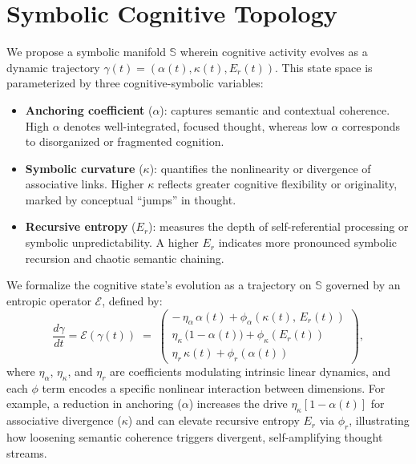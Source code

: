 \section*{Symbolic Cognitive Topology}

We propose a symbolic manifold $\mathbb{S}$ wherein cognitive activity evolves as a dynamic trajectory $\gamma(t) = (\alpha(t), \kappa(t), E_r(t))$. This state space is parameterized by three cognitive-symbolic variables:
\begin{itemize}
    \item \textbf{Anchoring coefficient} ($\alpha$): captures semantic and contextual coherence. High $\alpha$ denotes well-integrated, focused thought, whereas low $\alpha$ corresponds to disorganized or fragmented cognition.
    \item \textbf{Symbolic curvature} ($\kappa$): quantifies the nonlinearity or divergence of associative links. Higher $\kappa$ reflects greater cognitive flexibility or originality, marked by conceptual ``jumps'' in thought.
    \item \textbf{Recursive entropy} ($E_r$): measures the depth of self-referential processing or symbolic unpredictability. A higher $E_r$ indicates more pronounced symbolic recursion and chaotic semantic chaining.
\end{itemize}

We formalize the cognitive state’s evolution as a trajectory on $\mathbb{S}$ governed by an entropic operator $\mathcal{E}$, defined by:
\[
\frac{d\gamma}{dt} = \mathcal{E}(\gamma(t)) \;=\;
\begin{pmatrix}
    -\,\eta_\alpha\,\alpha(t) + \phi_\alpha(\kappa(t),\,E_r(t))\\
    \eta_\kappa\,\big(1 - \alpha(t)\big) + \phi_\kappa(E_r(t))\\
    \eta_r\,\kappa(t) + \phi_r(\alpha(t))
\end{pmatrix}\!,
\]
where $\eta_\alpha$, $\eta_\kappa$, and $\eta_r$ are coefficients modulating intrinsic linear dynamics, and each $\phi$ term encodes a specific nonlinear interaction between dimensions. For example, a reduction in anchoring ($\alpha$) increases the drive $\eta_\kappa[1-\alpha(t)]$ for associative divergence ($\kappa$) and can elevate recursive entropy $E_r$ via $\phi_r$, illustrating how loosening semantic coherence triggers divergent, self-amplifying thought streams.

